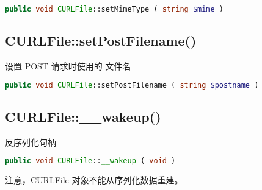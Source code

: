 \begin{lstlisting}[language=PHP]
public void CURLFile::setMimeType ( string $mime )
\end{lstlisting}


\subsection{CURLFile::setPostFilename()}

设置 POST 请求时使用的 文件名

\begin{lstlisting}[language=PHP]
public void CURLFile::setPostFilename ( string $postname )
\end{lstlisting}



\subsection{CURLFile::\_\_wakeup()}

反序列化句柄

\begin{lstlisting}[language=PHP]
public void CURLFile::__wakeup ( void )
\end{lstlisting}

注意，CURLFile 对象不能从序列化数据重建。


\begin{lstlisting}[language=PHP]

\end{lstlisting}




\begin{lstlisting}[language=PHP]

\end{lstlisting}




\begin{lstlisting}[language=PHP]

\end{lstlisting}




\begin{lstlisting}[language=PHP]

\end{lstlisting}



